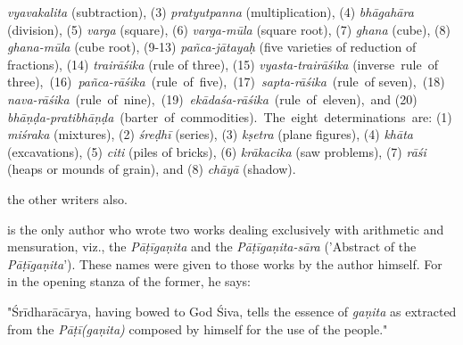 \documentclass[10pt, openany]{book}
\begin{document}
{
{\textit{vyavakalita }(subtraction), (3) \textit{pratyutpanna }(multiplication), (4)}
{\textit{bhāgahāra} (division), (5)\textit{ varga} (square), (6) \textit{varga-mūla }(square}
{root), (7)\textit{ ghana }(cube), (8) \textit{ghana-mūla }(cube root), (9-13)}
{\textit{pañca-jātayaḥ} (five varieties of reduction of fractions), (14)}
{\textit{trairāśika }(rule of three), (15) \textit{vyasta-trairāśika }(inverse \,rule \,of \,three), \,(16) \,\textit{pañca-rāśika} \,(rule \,of \,five), \,(17) \,\textit{sapta-rāśika} \,(rule \,of seven), \,(18) \,\textit{nava-rāśika} \,(rule \,of \,nine), \,(19) \,\textit{ekādaśa-rāśika} \,(rule \,of \,eleven), \,and (20) \textit{bhāṇḍa-pratibhāṇḍa} \,(barter \,of \,commodities). \,{The \,eight \,determinations \,are: (1)}
\textit{miśraka}}
{(mixtures), (2)\textit{ śreḍhī} (series), (3) \textit{kṣetra} (plane figures),
(4)}
{\textit{khāta }(excavations), (5)\textit{ citi} (piles of bricks), (6) \textit{krākacika}}
{(saw problems), (7)\textit{ rāśi} (heaps or mounds of grain), and (8)}
{\textit{chāyā }(shadow).}

\vspace{0.3cm}{More or less the same topics have been recognized by}
{the other writers also.}

\vspace{0.3cm}{3. WORKS OF SRIDHARACARYA. Śrīdharācārya}
{is the only author who wrote two works dealing exclusively}
{with arithmetic and mensuration, viz., the \textit{Pāṭīgaṇita} and the}
\textit{Pāṭīgaṇita-sāra }('Abstract of the \textit{Pāṭīgaṇita}'). These names
{were given to those works by the author himself. For in the}
{opening stanza of the former, he says:}


\vspace{0.3cm}

\newpage

{\eqt "Śrīdharācārya, having bowed to God Śiva, tells the essence of\textit{ gaṇita} as extracted from the \textit{Pāṭī(gaṇita)} composed by himself for the use of the people."}

}
\end{document}
